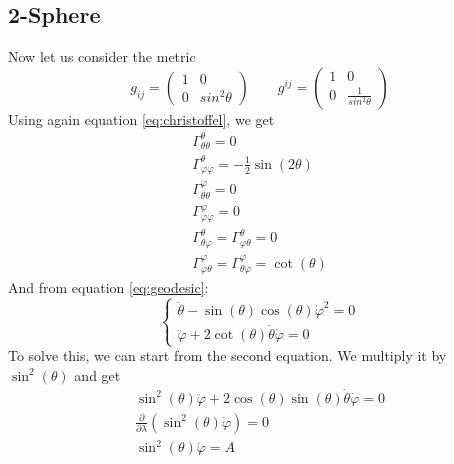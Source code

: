\documentclass{article}
\begin{document}
\subsection{2-Sphere}
Now let us consider the metric
\begin{equation}
    g_{ij} = \begin{pmatrix} 1 & 0 \\ 0 & sin^2\theta\end{pmatrix}
    \qquad
    g^{ij} = \begin{pmatrix} 1 & 0 \\ 0 & \frac{1}{sin^2\theta}\end{pmatrix}
\end{equation}
Using again equation \ref{eq:christoffel}, we get
\begin{equation}
\begin{gathered}
    \Gamma^{\theta}_{\theta\theta} = 0
    \\
    \Gamma^{\theta}_{\varphi\varphi} = -\frac{1}{2}\sin(2\theta)
    \\
    \Gamma^{\varphi}_{\theta\theta} = 0
    \\
    \Gamma^{\varphi}_{\varphi\varphi} = 0
    \\
    \Gamma^{\theta}_{\theta\varphi} = \Gamma^{\theta}_{\varphi\theta} = 0
    \\
    \Gamma^{\varphi}_{\varphi\theta} = \Gamma^{\varphi}_{\theta\varphi} = \cot(\theta)
\end{gathered}
\end{equation}
And from equation \ref{eq:geodesic}:
\begin{equation}
    \begin{cases}
        \ddot{\theta} - \sin(\theta)\cos(\theta)\dot{\varphi}^2 = 0
        \\
        \ddot{\varphi} + 2 \cot(\theta) \dot{\theta}\dot{\varphi} = 0
    \end{cases}
\end{equation}
To solve this, we can start from the second equation. We multiply it by $\sin^2(\theta)$ and get
\begin{equation}
\begin{gathered}
    \sin^2(\theta)\ddot{\varphi} + 2\cos(\theta)\sin(\theta)\dot{\theta}\dot{\varphi} = 0
    \\
    \frac{\partial}{\partial \lambda}\left(\sin^2(\theta)\dot{\varphi}\right) = 0
    \\
    \sin^2(\theta)\dot{\varphi} = A
\end{gathered}
\end{equation}
\end{document}

